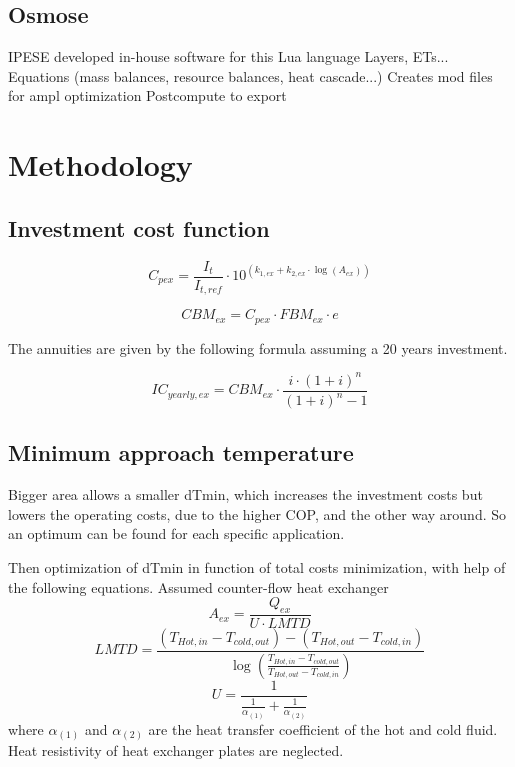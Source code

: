 \documentclass{article}
\begin{document}
\subsection{Osmose}
IPESE developed in-house software for this
Lua language
Layers, ETs...
Equations (mass balances, resource balances, heat cascade...)
Creates mod files for ampl optimization
Postcompute to export


\section{Methodology}

\subsection{Investment cost function}
\begin{equation}
C_{pex} = \frac{I_{t}}{I_{t,ref}} \cdot 10^ {(k_{1,ex} + k_{2,ex} \cdot \log(A_{ex}))}
\end{equation}

\begin{equation}
CBM_{ex} = C_{pex} \cdot FBM_{ex} \cdot e 
\end{equation}

The annuities are given by the following formula assuming a 20 years investment. 

\begin{equation}
IC_{yearly,ex} = CBM_{ex} \cdot \frac{i \cdot (1 + i)^n}{(1 + i)^n - 1} 
\end{equation}

\subsection{Minimum approach temperature}
Bigger area allows a smaller dTmin, which increases the investment costs but lowers the operating costs, due to the higher COP, and the other way around. So an optimum can be found for each specific application.

Then optimization of dTmin in function of total costs minimization, with help of the following equations. Assumed counter-flow heat exchanger 
\begin{equation}\label{eq:HEX_area}
    A_{ex} = \frac{Q_{ex}}{U \cdot LMTD}
\end{equation}
\begin{equation}\label{eq:LMTD}
    LMTD= \frac{(T_{Hot,in } - T_{cold,out }) - (T_{Hot,out } - T_{cold,in }) }{ \log{ (\frac{T_{Hot,in } - T_{cold,out }}{T_{Hot,out } - T_{cold,in }} ) }}
\end{equation}
\begin{equation}\label{eq:alpha}
    U= \frac{1}{ \frac{1}{\alpha_{(1)} } + \frac{1}{\alpha_{(2)}} }
\end{equation}
where $\alpha_{(1)}$ and $\alpha_{(2)}$ are the heat transfer coefficient of the hot and cold fluid. Heat resistivity of heat exchanger plates are neglected.
\end{document}
